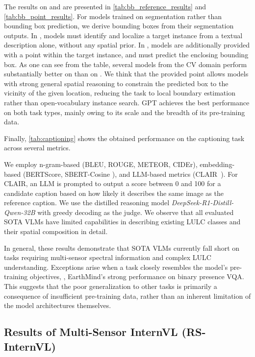 The results on  and \pointDet{} are presented in \cref{tab:bb_reference_results} and \cref{tab:bb_point_results}.
For models trained on segmentation rather than bounding box prediction, we derive bounding boxes from their segmentation outputs.
In , models must identify and localize a target instance from a textual description alone, without any spatial prior.
In \pointDet, models are additionally provided with a point within the target instance, and must predict the enclosing bounding box.
As one can see from the table, several models from the \ac{CV} domain perform substantially better on \pointDet{} than on .
We think that the provided point allows models with strong general spatial reasoning to constrain the predicted box to the vicinity of the given location, reducing the task to local boundary estimation rather than open-vocabulary instance search.
GPT achieves the best performance on both task types, mainly owing to its scale and the breadth of its pre-training data.


Finally, \cref{tab:captioning} shows the obtained performance on the captioning task across several metrics.

We employ n-gram-based (BLEU, ROUGE, METEOR, CIDEr), embedding-based (BERTScore, SBERT-Cosine \cite{zhang2019bertscore, reimers-gurevych-2019-sentence}), and \ac{LLM}-based metrics (CLAIR~\cite{chan-etal-2023-clair}).
For CLAIR, an \ac{LLM} is prompted to output a score between 0 and 100 for a candidate caption based on how likely it describes the same image as the reference caption. We use the distilled reasoning model \textit{DeepSeek-R1-Distill-Qwen-32B} with greedy decoding as the judge.
We observe that all evaluated \ac{SOTA} \acp{VLM} have limited capabilities in describing existing \ac{LULC} classes and their spatial composition in detail.

In general, these results demonstrate that \ac{SOTA} \acp{VLM} currently fall short on tasks requiring multi-sensor spectral information and complex \ac{LULC} understanding.
Exceptions arise when a task closely resembles the model's pre-training objectives, \eg, EarthMind's strong performance on binary presence \ac{VQA}.
This suggests that the poor generalization to other \bentxt{} tasks is primarily a consequence of insufficient pre-training data, rather than an inherent limitation of the model architectures themselves.

\subsection{Results of Multi-Sensor InternVL (RS-InternVL)}

